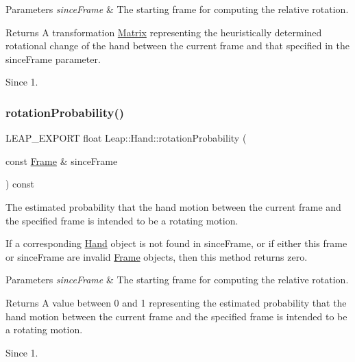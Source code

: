 \begin{DoxyParams}{Parameters}
{\em since\+Frame} & The starting frame for computing the relative rotation. \\
\hline
\end{DoxyParams}
\begin{DoxyReturn}{Returns}
A transformation \hyperlink{struct_leap_1_1_matrix}{Matrix} representing the heuristically determined rotational change of the hand between the current frame and that specified in the since\+Frame parameter. 
\end{DoxyReturn}
\begin{DoxySince}{Since}
1. 
\end{DoxySince}
\mbox{\label{class_leap_1_1_hand_a32ed1424fa35250b69299d9e8cb7d030}} 
\subsubsection{\texorpdfstring{rotation\+Probability()}{rotationProbability()}}
{\footnotesize\ttfamily L\+E\+A\+P\+\_\+\+E\+X\+P\+O\+RT float Leap\+::\+Hand\+::rotation\+Probability (\begin{DoxyParamCaption}\item[{const \hyperlink{class_leap_1_1_frame}{Frame} \&}]{since\+Frame }\end{DoxyParamCaption}) const}

The estimated probability that the hand motion between the current frame and the specified frame is intended to be a rotating motion.


\begin{DoxyCodeInclude}
\end{DoxyCodeInclude}


If a corresponding \hyperlink{class_leap_1_1_hand}{Hand} object is not found in since\+Frame, or if either this frame or since\+Frame are invalid \hyperlink{class_leap_1_1_frame}{Frame} objects, then this method returns zero.


\begin{DoxyParams}{Parameters}
{\em since\+Frame} & The starting frame for computing the relative rotation. \\
\hline
\end{DoxyParams}
\begin{DoxyReturn}{Returns}
A value between 0 and 1 representing the estimated probability that the hand motion between the current frame and the specified frame is intended to be a rotating motion. 
\end{DoxyReturn}
\begin{DoxySince}{Since}
1. 
\end{DoxySince}
\mbox{\label{class_leap_1_1_hand_a2c1afe066bbc1b33433c84d6302447cb}} 
